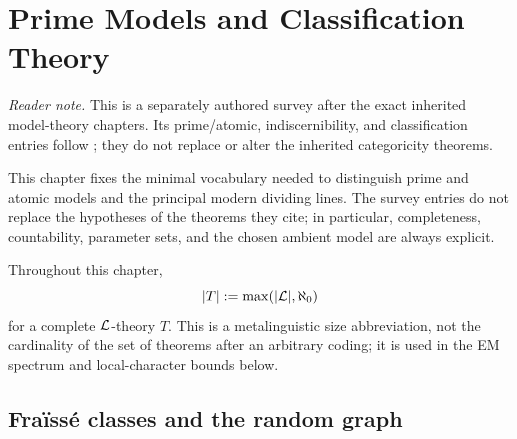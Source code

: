 \chapter{Prime Models and Classification Theory}
\label{sec:p03-classification-theory}

\noindent\textit{Reader note.}  This is a separately authored survey after the
exact inherited model-theory chapters.  Its prime/atomic, indiscernibility, and
classification entries follow \cite{Marker2002,Hodges1993}; they do not replace
or alter the inherited categoricity theorems.

This chapter fixes the minimal vocabulary needed to distinguish prime and
atomic models and the principal modern dividing lines.  The survey entries do
not replace the hypotheses of the theorems they cite; in particular,
completeness, countability, parameter sets, and the chosen ambient model are
always explicit.

Throughout this chapter,
\[
  \lvert T\rvert\mathrel{:=}\max(\lvert\mathcal{L}\rvert,\aleph_0)
\]
for a complete \(\mathcal{L}\)-theory \(T\).  This is a metalinguistic size
abbreviation, not the cardinality of the set of theorems after an arbitrary
coding; it is used in the EM spectrum and local-character bounds below.

\section{Fra\"iss\'e classes and the random graph}
\label{sec:p03-fraisse}

